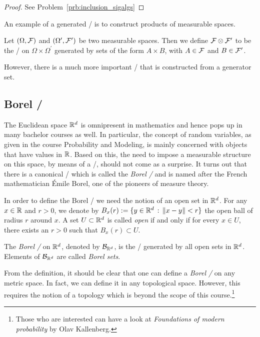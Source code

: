 \begin{proof}
See Problem~\ref{prb:inclusion_sigalgs}
\end{proof}

An example of a generated \sigalg/ is to construct products of measurable spaces.

\begin{definition}\label{def:product_sigalg}
Let $(\Omega, \mathcal F)$ and $(\Omega^\prime, \mathcal F^\prime)$ be two measurable spaces. Then we define $\mathcal F \otimes \mathcal F^\prime$ to be the \sigalg/ on $\Omega \times \Omega^\prime$ generated by sets of the form $A \times B$, with $A \in \mathcal F$ and $B \in \mathcal F^\prime$.
\end{definition}

However, there is a much more important \sigalg/ that is constructed from a generator set.

\subsection{Borel \sigalg/}

The Euclidean space $\mathbb R^d$ is omnipresent in mathematics and hence pops up in many bachelor courses as well. In particular, the concept of random variables, as given in the course Probability and Modeling, is mainly concerned with objects that have values in $\mathbb R$. Based on this, the need to impose a measurable structure on this space, by means of a \sigalg/, should not come as a surprise. It turns out that there is a canonical \sigalg/ which is called the \emph{Borel \sigalg/} and is named after the French mathematician \'{E}mile Borel, one of the pioneers of measure theory.

In order to define the Borel \sigalg/ we need the notion of an open set in $\mathbb R^d$. For any $x \in \mathbb R$ and $r >0$, we denote by $B_x(r) := \{y \in \mathbb R^d \, : \, \|x-y\|<r\}$ the open ball of radius $r$ around $x$. A set $U \subset \mathbb R^d$ is called \emph{open} if and only if for every $x \in U$, there exists an $r > 0$ such that $B_x(r) \subset U$.

\begin{definition}
The \emph{Borel \sigalg/} on $\mathbb R^d$, denoted by $\mathcal B_{\mathbb R^d}$, is the \sigalg/ generated by all open sets in $\mathbb R^d$. Elements of $\mathcal B_{\mathbb R^d}$ are called \emph{Borel sets}.
\end{definition}

\begin{remark}
From the definition, it should be clear that one can define a \emph{Borel \sigalg/} on any metric space. In fact, we can define it in any topological space. However, this requires the notion of a topology which is beyond the scope of this course.\footnote{Those who are interested can have a look at \emph{Foundations of modern probability} by Olav Kallenberg.}
\end{remark}

